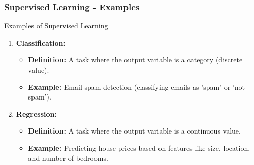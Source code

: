 \documentclass[aspectratio=169]{beamer}
\begin{document}
\begin{frame}[fragile]
    \frametitle{Supervised Learning - Examples}
    \begin{block}{Examples of Supervised Learning}
        \begin{enumerate}
            \item \textbf{Classification:}
                \begin{itemize}
                    \item \textbf{Definition:} A task where the output variable is a category (discrete value).
                    \item \textbf{Example:} Email spam detection (classifying emails as 'spam' or 'not spam').
                \end{itemize}
            
            \item \textbf{Regression:}
                \begin{itemize}
                    \item \textbf{Definition:} A task where the output variable is a continuous value.
                    \item \textbf{Example:} Predicting house prices based on features like size, location, and number of bedrooms.
                \end{itemize}
        \end{enumerate}
    \end{block}
\end{frame}
\end{document}
